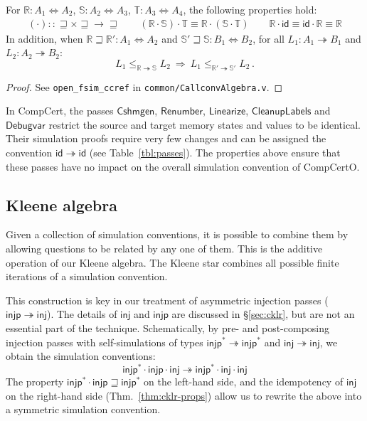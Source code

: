 \documentclass[acmsmall,screen,review,anonymous]{acmart}
\newcommand{\kw}[1]{\ensuremath{ \mathsf{#1} }}
\newcommand{\scref}{\sqsupseteq}
\begin{document}
\begin{theorem} %
For
$\mathbb{R} : A_1 \Leftrightarrow A_2$,
$\mathbb{S} : A_2 \Leftrightarrow A_3$,
$\mathbb{T} : A_3 \Leftrightarrow A_4$,
the following properties hold:
\begin{gather*}
  ({\cdot}) :: {{\scref} \times {\scref} \rightarrow {\scref}}
  \qquad
  (\mathbb{R} \cdot \mathbb{S}) \cdot \mathbb{T} \equiv
    \mathbb{R} \cdot (\mathbb{S} \cdot \mathbb{T})
  \qquad
  \mathbb{R} \cdot \kw{id} \equiv
  \kw{id} \cdot \mathbb{R} \equiv
  \mathbb{R}
\end{gather*}
In addition, when
$\mathbb{R} \scref \mathbb{R}' : A_1 \Leftrightarrow A_2$ and
$\mathbb{S}' \scref \mathbb{S} : B_1 \Leftrightarrow B_2$,
for all
$L_1 : A_1 \twoheadrightarrow B_1$ and $L_2 : A_2 \twoheadrightarrow B_2$:
\[
      L_1 \le_{\mathbb{R} \twoheadrightarrow \mathbb{S}} L_2
      \: \Rightarrow \:
      L_1 \le_{\mathbb{R}' \twoheadrightarrow \mathbb{S}'} L_2 \,.
\]
\begin{proof}
See \texttt{open\_fsim\_ccref} in \texttt{common/CallconvAlgebra.v}.
\end{proof}
\end{theorem}

In CompCert,
the passes \kw{Cshmgen}, \kw{Renumber}, \kw{Linearize},
\kw{CleanupLabels} and \kw{Debugvar}
restrict the source and target
memory states and values to be identical.
Their simulation proofs require very few changes
and can be assigned the convention $\kw{id} \twoheadrightarrow \kw{id}$
(see Table~\ref{tbl:passes}).
The properties above ensure that these passes
have no impact on the overall simulation convention
of CompCertO.


\subsection{Kleene algebra} %

Given a collection of simulation conventions,
it is possible to combine them
by allowing questions to be related by any one of them.
This is the additive operation of our Kleene algebra.
The Kleene star combines all possible finite iterations
of a simulation convention.

This construction is key in our treatment of
asymmetric injection passes
($\kw{injp} \twoheadrightarrow \kw{inj}$).
The details of $\kw{inj}$ and $\kw{injp}$
are discussed in \S\ref{sec:cklr},
but are not an essential part of the technique.
Schematically,
by pre- and post-composing injection passes
with self-simulations of types
$\kw{injp}^* \twoheadrightarrow \kw{injp}^*$ and
$\kw{inj} \twoheadrightarrow \kw{inj}$,
we obtain the simulation conventions:
\[
  \kw{injp}^* \cdot \kw{injp} \cdot \kw{inj}
  \twoheadrightarrow
  \kw{injp}^* \cdot \kw{inj} \cdot \kw{inj}
\]
The property $\kw{injp}^* \cdot \kw{injp} \scref \kw{injp}^*$
on the left-hand side,
and the idempotency of $\kw{inj}$
on the right-hand side (Thm.~\ref{thm:cklr-props})
allow us to rewrite the above into
a symmetric simulation convention.
\end{document}
